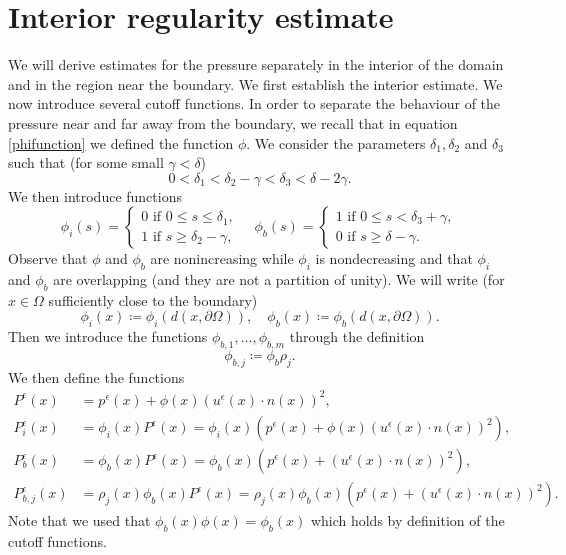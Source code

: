 \documentclass[12pt,a4paper]{article}
\theoremstyle{definition}
\theoremstyle{remark}
\numberwithin{equation}{section}
\begin{document}
\section{Interior regularity estimate} \label{interiorsection}
We will derive estimates for the pressure separately in the interior of the domain and in the region near the boundary. We first establish the interior estimate. We now introduce several cutoff functions.
In order to separate the behaviour of the pressure near and far away from the boundary, we recall that in equation \eqref{phifunction} we defined the function $\phi$.
We consider the parameters $\delta_1, \delta_2$ and $\delta_3$ such that (for some small $\gamma < \delta$)
\begin{equation*}
0 < \delta_1 < \delta_2 - \gamma < \delta_3 < \delta - 2 \gamma.
\end{equation*}
We then introduce functions 
\begin{equation*}
\phi_i (s) = \begin{cases}
0 \text{ if } 0 \leq s \leq \delta_1, \\
1 \text{ if } s \geq \delta_2 - \gamma,
\end{cases} \quad \phi_b (s) = \begin{cases}
1 \text{ if } 0 \leq s < \delta_3 + \gamma, \\
0 \text{ if } s \geq \delta - \gamma.
\end{cases}
\end{equation*}
Observe that $\phi$ and $\phi_b$ are nonincreasing while $\phi_i$ is nondecreasing and that $\phi_i$ and $\phi_b$ are overlapping (and they are not a partition of unity). We will write (for $x \in \Omega$ sufficiently close to the boundary)
\begin{equation*}
\phi_i (x) \coloneqq \phi_i (d(x, \partial \Omega)), \quad \phi_b (x) \coloneqq \phi_b (d(x, \partial \Omega)).
\end{equation*}
Then we introduce the functions $\phi_{b,1}, \ldots, \phi_{b,m}$ through the definition
\begin{equation*}
\phi_{b,j} \coloneqq \phi_b \rho_j.
\end{equation*}
We then define the functions
\begingroup
\allowdisplaybreaks
\begin{align}
P^\epsilon (x) &= p^\epsilon (x) + \phi (x) (u^\epsilon (x) \cdot n(x))^2, \label{mollifiedpressure1} \\
P^\epsilon_i (x) &= \phi_i (x) P^\epsilon (x) = \phi_i (x) ( p^\epsilon (x) + \phi (x) (u^\epsilon (x) \cdot n(x))^2 ), \label{mollifiedpressure2} \\
P^\epsilon_{b} (x) &= \phi_b (x) P^\epsilon (x) = \phi_b (x) ( p^\epsilon (x) + (u^\epsilon (x) \cdot n(x))^2 ), \\
P^\epsilon_{b,j} (x) &= \rho_j (x) \phi_b (x) P^\epsilon (x) = \rho_j (x) \phi_b (x) ( p^\epsilon (x) + (u^\epsilon (x) \cdot n(x))^2 ). \label{mollifiedpressure3}
\end{align}
\endgroup
Note that we used that $\phi_b (x) \phi (x) = \phi_b (x)$ which holds by definition of the cutoff functions. 
\end{document}
